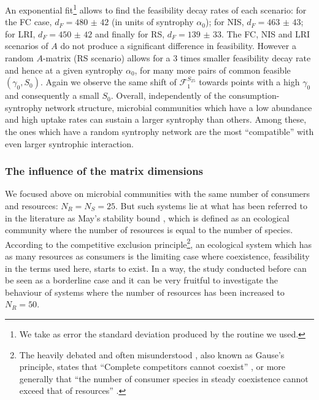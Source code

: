 \documentclass[12pt, titlepage]{report}
\begin{document}
An exponential fit\footnote{We take as error the standard deviation produced by the  routine we used.} allows to find the feasibility decay rates of each scenario: for the FC case, $d_F=\num[scientific-notation=false]{480(42)}$ (in units of syntrophy $\alpha_0$); for NIS, $d_F=\num[scientific-notation=false]{463(43)}$; for LRI, $d_F=\num[scientific-notation=false]{450(42)}$ and finally for RS, $d_F=\num[scientific-notation=false]{139(33)}$. The FC, NIS and LRI scenarios of $A$ do not produce a significant difference in feasibility. However a random $A$-matrix (RS scenario) allows for a 3 times smaller feasibility decay rate and hence at a given syntrophy $\alpha_0$, for many more pairs of common feasible $(\gamma_0, S_0)$.
Again we observe the same shift of $\mathcal{F}_1^{S_{25}}$ towards points with a high $\gamma_0$ and consequently a small $S_0$. Overall, independently of the consumption-syntrophy network structure, microbial communities which have a low abundance and high uptake rates can sustain a larger syntrophy than others. Among these, the ones which have a random syntrophy network are the most ``compatible'' with even larger syntrophic interaction.


\FloatBarrier
\subsubsection{The influence of the matrix dimensions}
We focused above on microbial communities with the same number of consumers and resources: $N_R=N_S=25$. But such systems lie at what has been referred to in the literature as May's stability bound \cite{biroli_marginally_2018}, which is defined as an ecological community where the number of resources is equal to the number of species. According to the competitive exclusion principle\footnote{The heavily debated and often misunderstood \cite{hardin_competitive_1960} , also known as Gause's principle, states that ``Complete competitors cannot coexist'' \cite{hardin_competitive_1960}, or more generally that ``the number of consumer species in steady coexistence cannot exceed that of resources'' \cite{wang_overcome_2019}.}, an ecological system which has as many resources as consumers is the limiting case where coexistence, \ie feasibility in the terms used here, starts to exist. In a way, the study conducted before can be seen as a borderline case and it can be very fruitful to investigate the behaviour of systems where the number of resources has been increased to $N_R=50$.
\end{document}
